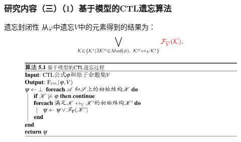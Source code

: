 \documentclass[aspectratio=1610, 9pt, CJK]{beamer}
\begin{document}
\begin{frame}
	\frametitle{研究内容（三）（1）基于模型的CTL遗忘算法}
		
		\begin{block}{遗忘封闭性}
			从$\varphi$中遗忘$V$中的元素得到的结果为：
			\begin{equation*}
				\bigvee_{{\cal K}\in  \{{\cal K}'\mid \exists {\cal K}''\in\textit{Mod}(\phi),\ {\cal K}''\leftrightarrow_V{\cal K}'\}} \textcolor{red}{{\cal F}_{\overline V}({\cal K})}.
			\end{equation*}
		\end{block}
	
		\begin{figure}
			\includegraphics[scale=0.6]{figures/model-basedAlg}
		\end{figure}

\end{frame}
\end{document}
